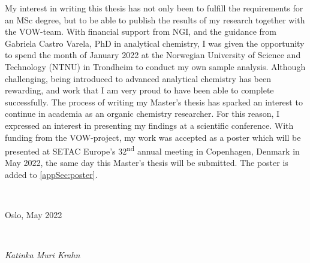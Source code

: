My interest in writing this thesis has not only been to fulfill the requirements for an MSc degree, but to be able to publish the results of my research together with the VOW-team. With financial support from NGI, and the guidance from Gabriela Castro Varela, PhD in analytical chemistry, I was given the opportunity to spend the month of January 2022 at the Norwegian University of Science and Technology (NTNU) in Trondheim to conduct my own sample analysis. Although challenging, being introduced to advanced analytical chemistry has been rewarding, and work that I am very proud to have been able to complete successfully. The process of writing my Master's thesis has sparked an interest to continue in academia as an organic chemistry researcher. For this reason, I expressed an interest in presenting my findings at a scientific conference. With funding from the VOW-project, my work was accepted as a poster which will be presented at SETAC Europe's 32\textsuperscript{nd} annual meeting in Copenhagen, Denmark in May 2022, the same day this Master's thesis will be submitted. The poster is added to \cref{appSec:poster}.  

~\\
\centerline{Oslo, May 2022} \\
\centerline{\textit{Katinka Muri Krahn}}



